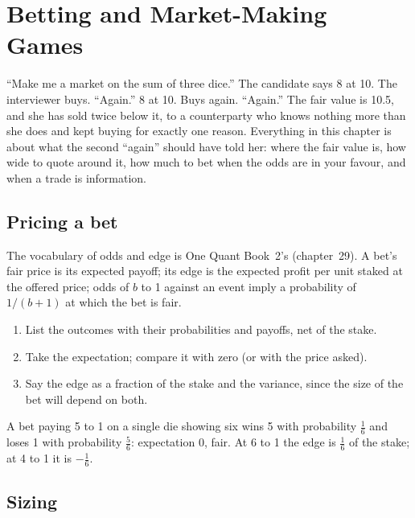 \chapter{Betting and Market-Making Games}\label{ch:iv:betting-and-market-making-games}

``Make me a market on the sum of three dice.'' The candidate says 8 at 10. The interviewer buys. ``Again.'' 8 at
10. Buys again. ``Again.'' The fair value is 10.5, and she has sold twice below it, to a counterparty who knows
nothing more than she does and kept buying for exactly one reason. Everything in this chapter is about what the
second ``again'' should have told her: where the fair value is, how wide to quote around it, how much to bet when
the odds are in your favour, and when a trade is information.

\section{Pricing a bet}

The vocabulary of odds and edge is One Quant Book~2's (chapter~29). A bet's fair price is its expected payoff;
its edge is the expected profit per unit staked at the offered price; odds of $b$ to 1 against an event imply a
probability of $1/(b+1)$ at which the bet is fair.

\begin{method}\label{met:iv:betting-and-market-making-games:price}
\begin{enumerate}
\item List the outcomes with their probabilities and payoffs, net of the stake.
\item Take the expectation; compare it with zero (or with the price asked).
\item Say the edge as a fraction of the stake and the variance, since the size of the bet will depend on both.
\end{enumerate}
\end{method}

\begin{example}\label{ex:iv:betting-and-market-making-games:odds}
A bet paying 5 to 1 on a single die showing six wins 5 with probability $\tfrac16$ and loses 1 with probability
$\tfrac56$: expectation 0, fair. At 6 to 1 the edge is $\tfrac16$ of the stake; at 4 to 1 it is $-\tfrac16$.
\end{example}

\section{Sizing}

